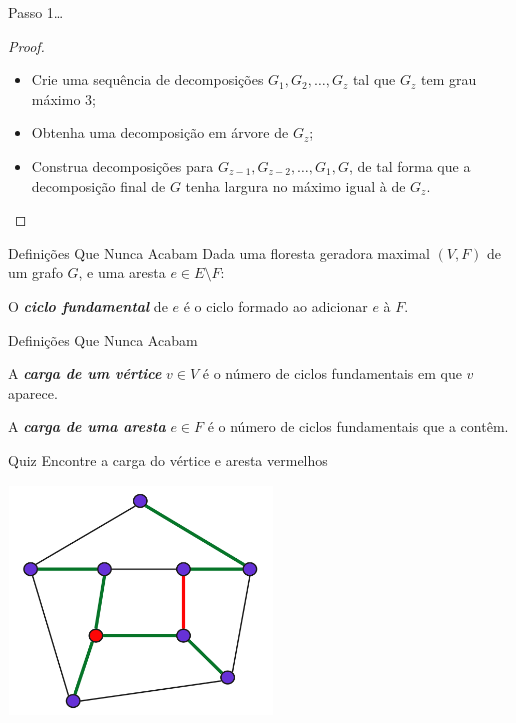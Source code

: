 \begin{frame}{Passo 1\dots}
    \begin{proof}
        \begin{itemize}[-]
            \item Crie uma sequência de decomposições $G_{1}, G_{2}, \dots, G_{z}$ tal que $G_{z}$ tem grau máximo $3$;
            \item Obtenha uma decomposição em árvore de $G_z$;
            \item Construa decomposições para $G_{z-1}, G_{z-2}, \dots, G_1, G$, de tal forma que a decomposição final de $G$ tenha largura no máximo igual à de $G_z$.
        \end{itemize}
    \end{proof}
\end{frame}

\begin{frame}{Definições Que Nunca Acabam}
    \Large{Dada uma floresta geradora maximal $(V, F)$ de um grafo $G$, e uma aresta $e \in E \setminus F$:}
    \bigbreak

    \begin{defi}
        O \emph{\textbf{ciclo fundamental}} de $e$ é o ciclo formado ao adicionar $e$ à $F$.
    \end{defi}
\end{frame}

\begin{frame}{Definições Que Nunca Acabam}
    \begin{defi}
        A \emph{\textbf{carga de um vértice}} $v \in V$ é o número de ciclos fundamentais em que $v$ aparece.
    \end{defi}

    \begin{defi}
        A \emph{\textbf{carga de uma aresta}} $e \in F$ é o número de ciclos fundamentais que a contêm.
    \end{defi}
\end{frame}

\begin{frame}{Quiz}
    \centering\Large
    Encontre a carga do vértice e aresta vermelhos\bigbreak
    \begin{minipage}{\linewidth}
        \centering
        \includegraphics[width=7cm]{images/load_1.jpg}
    \end{minipage}
\end{frame}

